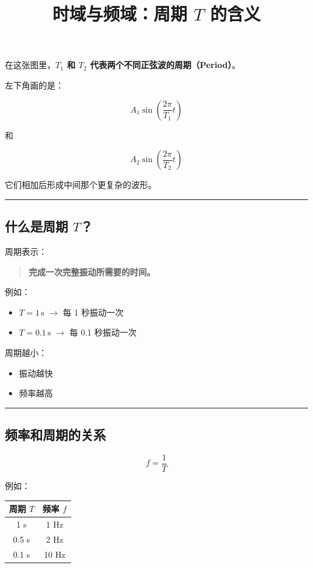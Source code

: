 \documentclass[UTF8,a4paper,11pt]{ctexart}
\title{时域与频域：周期 $T$ 的含义}
\author{}
\date{}
\begin{document}
\maketitle

在这张图里，\textbf{$T_1$ 和 $T_2$ 代表两个不同正弦波的周期（Period）}。

左下角画的是：

\[
A_1\sin\left(\frac{2\pi}{T_1}t\right)
\]

和

\[
A_2\sin\left(\frac{2\pi}{T_2}t\right)
\]

它们相加后形成中间那个更复杂的波形。

\bigskip\noindent\rule{\linewidth}{0.4pt}\bigskip

\subsection{什么是周期 $T$？}

周期表示：

\begin{quote}
\textbf{完成一次完整振动所需要的时间。}
\end{quote}

例如：

\begin{itemize}
  \item $T=1\,\mathrm{s}$ $\rightarrow$ 每 1 秒振动一次
  \item $T=0.1\,\mathrm{s}$ $\rightarrow$ 每 0.1 秒振动一次
\end{itemize}

周期越小：

\begin{itemize}
  \item 振动越快
  \item 频率越高
\end{itemize}

\bigskip\noindent\rule{\linewidth}{0.4pt}\bigskip

\subsection{频率和周期的关系}

\[
f=\frac{1}{T}
\]

例如：

\begin{center}
\begin{tabular}{cc}
  \toprule
  周期 $T$ & 频率 $f$ \\
  \midrule
  1 s & 1 Hz \\
  0.5 s & 2 Hz \\
  0.1 s & 10 Hz \\
  \bottomrule
\end{tabular}
\end{center}
\end{document}
